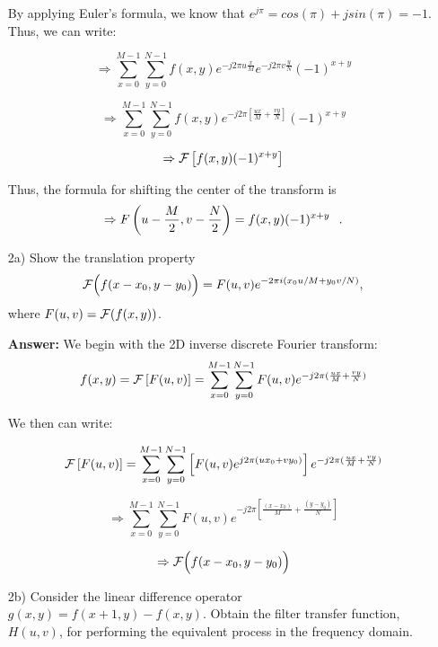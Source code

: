 \documentclass{article}
\begin{document}
\begin{enumerate}
By applying Euler's formula, we know that $e^{j\pi} = cos(\pi) + j sin(\pi) = -1$.  Thus, we can write:

\begin{equation}
\Rightarrow \sum_{x=0}^{M-1} \sum_{y=0}^{N-1} f(x,y) e^{-j2\pi u \frac{x}{M}} e^{-j2\pi v \frac{y}{N}} (-1)^{x+y}
\end{equation}

\begin{equation}
\Rightarrow \sum_{x=0}^{M-1} \sum_{y=0}^{N-1} f(x,y) e^{-j2\pi \left[ \frac{ux}{M} + \frac{vy}{N} \right]} (-1)^{x+y}
\end{equation}

\begin{equation}
\Rightarrow {\cal F} \left[ f(x,y) (-1)^{x+y} \right]
\end{equation}

Thus, the formula for shifting the center of the transform is
\begin{equation}
\Rightarrow F\left(u - \frac{M}{2}, v - \frac{N}{2}\right) = f(x,y) (-1)^{x+y} \hspace{0.1in} .
\end{equation}

\item[2a)] Show the translation property 
$${\cal F}\Big(f(x-x_0,y-y_0)\Big)=F(u,v)e^{-2\pi i(x_0u/M+y_0v/N)},$$
where $F(u,v)={\cal F}(f(x,y))$.

\textbf{Answer:} We begin with the 2D inverse discrete Fourier transform:
$$f(x,y) = {\cal F} \left[ F(u,v) \right] = \sum_{x=0}^{M-1} \sum_{y=0}^{N-1} F(u,v) e^{-j2\pi (\frac{ux}{M} + \frac{vy}{N})}$$

We then can write:

\begin{equation}
{\cal F} \left[ F(u,v) \right] =  \sum_{x=0}^{M-1} \sum_{y=0}^{N-1} \left[ F(u,v) e^{j2\pi (ux_0 + vy_0)} \right] e^{-j2 \pi (\frac{ux}{M} + \frac{vy}{N})}
\end{equation}

\begin{equation}
\Rightarrow \sum_{x=0}^{M-1} \sum_{y=0}^{N-1} F(u,v) e^{-j2\pi \left[ \frac{(x-x_0)}{M} + \frac{(y-y_0)}{N} \right]}
\end{equation}

\begin{equation}
\Rightarrow {\cal F}\Big(f(x-x_0,y-y_0)\Big)
\end{equation}

\item[2b)] Consider the linear difference operator $g(x,y)=f(x+1,y)-f(x,y)$. Obtain the filter transfer function, $H(u,v)$, for performing the equivalent process in the frequency domain. 


\end{enumerate}
\end{document}

